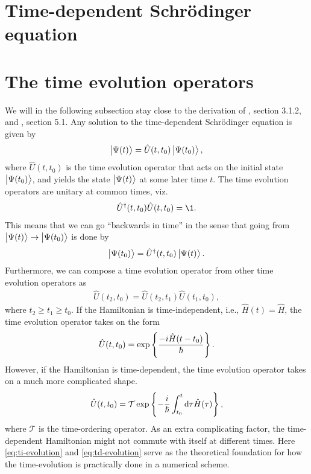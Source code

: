     \section{Time-dependent Schrödinger equation}
    \section{The time evolution operators}
        We will in the following subsection stay close to the derivation of
        \citeauthor{ullrich2011time} \cite{ullrich2011time}, section 3.1.2, and
        \citeauthor{joachain2012atoms} \cite{joachain2012atoms}, section 5.1.
        Any solution to the time-dependent Schrödinger equation is given by
        \begin{align}
            \ket{\Psi(t)} = \hat{U}(t, t_0)\ket{\Psi(t_0)},
        \end{align}
        where $\hat{U}(t, t_0)$ is the time evolution operator that acts on the
        initial state $\ket{\Psi(t_0)}$, and yields the state $\ket{\Psi(t)}$ at
        some later time $t$. The time evolution operators are unitary at common
        times, viz.
        \begin{align}
            \hat{U}^{\dagger}(t, t_0)\hat{U}(t, t_0) = \1.
        \end{align}
        This means that we can go ``backwards in time'' in the sense that going
        from $\ket{\Psi(t)} \to \ket{\Psi(t_0)}$ is done by
        \begin{align}
            \ket{\Psi(t_0)} = \hat{U}^{\dagger}(t, t_0)\ket{\Psi(t)}.
        \end{align}
        Furthermore, we can compose a time evolution operator from other time
        evolution operators as
        \begin{align}
            \hat{U}(t_2, t_0) = \hat{U}(t_2, t_1)\hat{U}(t_1, t_0),
        \end{align}
        where $t_2 \geq t_1 \geq t_0$. If the Hamiltonian is time-independent,
        i.e., $\hat{H}(t) = \hat{H}$, the time evolution operator takes on the
        form
        \begin{align}
            \hat{U}(t, t_0) = \exp\left\{ 
                \frac{-i \hat{H} (t - t_0)}{\hslash}
             \right\}.
            \label{eq:ti-evolution}
        \end{align}
        However, if the Hamiltonian is time-dependent, the time evolution
        operator takes on a much more complicated shape.
        \begin{align}
            \hat{U}(t, t_0) =
            \mathcal{T}\exp\left\{ 
                -\frac{i}{\hslash} \int_{t_0}^{t} \dd\tau
                \hat{H}(\tau)
             \right\},
            \label{eq:td-evolution}
        \end{align}
        where $\mathcal{T}$ is the time-ordering operator. As an extra
        complicating factor, the time-dependent Hamiltonian might not commute
        with itself at different times. Here \autoref{eq:ti-evolution} and
        \autoref{eq:td-evolution} serve as the theoretical foundation for how
        the time-evolution is practically done in a numerical scheme.

